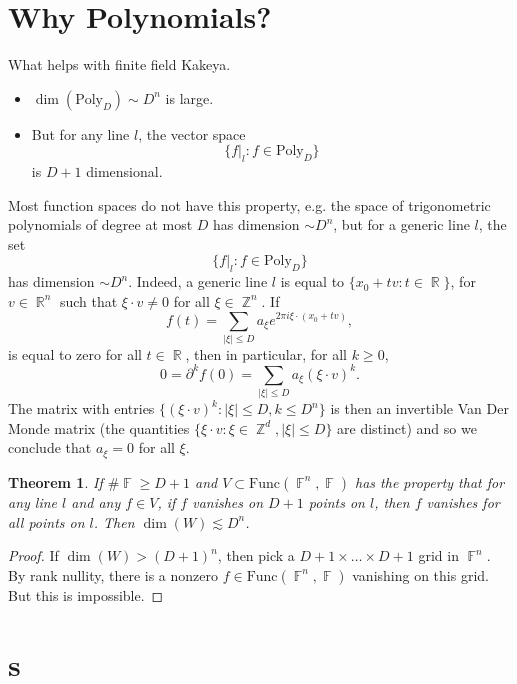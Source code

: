 \documentclass{article}
\DeclareMathOperator{\RR}{\mathbb{R}}
\DeclareMathOperator{\FF}{\mathbb{F}}
\DeclareMathOperator{\ZZ}{\mathbb{Z}}
\theoremstyle{plain}
\newtheorem{theorem}{Theorem}
\theoremstyle{definition}
\begin{document}
\section{Why Polynomials?}

What helps with finite field Kakeya.
%
\begin{itemize}
    \item $\dim(\text{Poly}_D) \sim D^n$ is large.

    \item But for any line $l$, the vector space
    \[ \{ f|_l : f \in \text{Poly}_D \} \]
    is $D+1$ dimensional.
\end{itemize}

Most function spaces do not have this property, e.g. the space of trigonometric polynomials of degree at most $D$ has dimension $\sim D^n$, but for a generic line $l$, the set
%
\[ \{ f|_l : f \in \text{Poly}_D \} \]
%
has dimension $\sim D^n$. Indeed, a generic line $l$ is equal to $\{ x_0 + t v : t \in \RR \}$, for $v \in \RR^n$ such that $\xi \cdot v \neq 0$ for all $\xi \in \ZZ^n$. If
%
\[ f(t) = \sum_{|\xi| \leq D} a_\xi e^{2 \pi i \xi \cdot (x_0 + t v)}, \]
%
is equal to zero for all $t \in \RR$, then in particular, for all $k \geq 0$,
%
\[ 0 = \partial^k f(0) = \sum_{|\xi| \leq D} a_\xi (\xi \cdot v)^k. \]
%
The matrix with entries $\{ (\xi \cdot v)^k : |\xi| \leq D, k \leq D^n \}$ is then an invertible Van Der Monde matrix (the quantities $\{ \xi \cdot v: \xi \in \ZZ^d,  |\xi| \leq D \}$ are distinct) and so we conclude that $a_\xi = 0$ for all $\xi$.

\begin{theorem}
    If $\# \FF \geq D + 1$ and $V \subset \text{Func}(\FF^n, \FF)$ has the property that for any line $l$ and any $f \in V$, if $f$ vanishes on $D + 1$ points on $l$, then $f$ vanishes for all points on $l$. Then $\dim(W) \lesssim D^n$.
\end{theorem}
\begin{proof}
    If $\dim(W) > (D+1)^n$, then pick a $D + 1 \times \dots \times D + 1$ grid in $\FF^n$. By rank nullity, there is a nonzero $f \in \text{Func}(\FF^n, \FF)$ vanishing on this grid. But this is impossible.
\end{proof}



\section{s}
\end{document}
